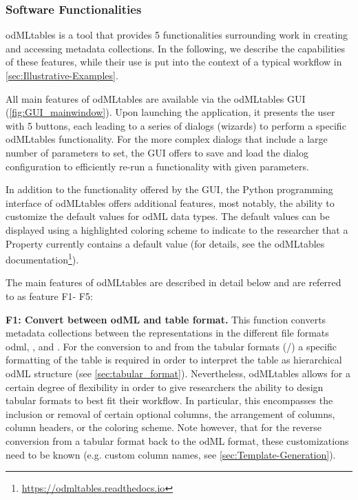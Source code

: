 \subsubsection{Software Functionalities}
\label{sec:software_functionalities} 

odMLtables is a tool that provides 5 functionalities surrounding work in creating and accessing metadata collections. In the following, we describe the capabilities of these features, while their use is put into the context of a typical workflow in \cref{sec:Illustrative-Examples}.

All main features of odMLtables are available via the odMLtables GUI (\cref{fig:GUI_mainwindow}). Upon launching the application, it presents the user with 5 buttons, each leading to a series of dialogs (wizards) to perform a specific odMLtables functionality. For the more complex dialogs that include a large number of parameters to set, the GUI offers to save and load the dialog configuration to efficiently re-run a functionality with given parameters. 

In addition to the functionality offered by the GUI, the Python programming interface of odMLtables offers additional features, most notably, the ability to customize the default values for odML data types. The default values can be displayed using a highlighted coloring scheme to indicate to the researcher that a Property currently contains a default value (for details, see the odMLtables documentation\footnote{\url{https://odmltables.readthedocs.io}}).

\def\fconvert{F1}
\def\fgenerate{F2} 
\def\fcompare{F3}
\def\fmerge{F4}
\def\ffilter{F5} 

The main features of odMLtables are described in detail below and are referred to as feature \fconvert - \ffilter:


\textbf{\fconvert: Convert between odML and table format.}
This function converts metadata collections between the representations in the different file formats odml, , and . For the conversion to and from the tabular formats (/) a specific formatting of the table is required in order to interpret the table as hierarchical odML structure (see \cref{sec:tabular_format}). Nevertheless, odMLtables allows for a certain degree of flexibility in order to give researchers the ability to design tabular formats to best fit their workflow. In particular, this encompasses the inclusion or removal of certain optional columns, the arrangement of columns, column headers, or the coloring scheme. Note however, that for the reverse conversion from a tabular format back to the odML format, these customizations need to be known (e.g. custom column names, see \cref{sec:Template-Generation}).

